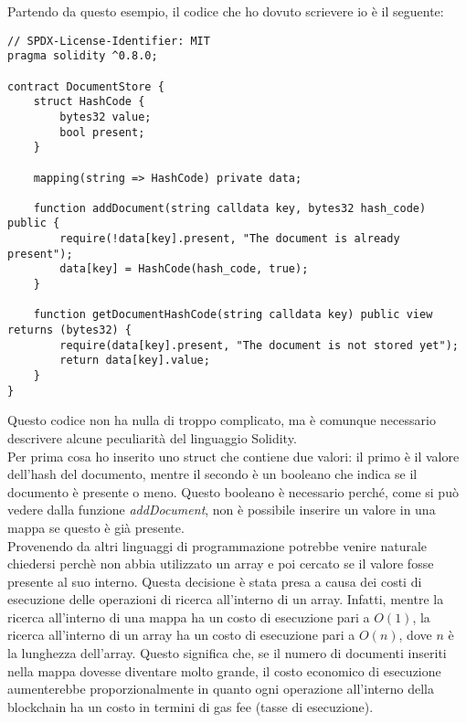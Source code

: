 Partendo da questo esempio, il codice che ho dovuto scrievere io è il seguente:
\begin{lstlisting}[language=Solidity]
// SPDX-License-Identifier: MIT
pragma solidity ^0.8.0;

contract DocumentStore {
    struct HashCode {
        bytes32 value;
        bool present;
    }

    mapping(string => HashCode) private data;

    function addDocument(string calldata key, bytes32 hash_code) public {
        require(!data[key].present, "The document is already present");
        data[key] = HashCode(hash_code, true);
    }

    function getDocumentHashCode(string calldata key) public view returns (bytes32) {
        require(data[key].present, "The document is not stored yet");
        return data[key].value;
    }
}
\end{lstlisting}

Questo codice non ha nulla di troppo complicato, ma è comunque necessario
descrivere alcune peculiarità del linguaggio Solidity.\\
Per prima cosa ho inserito uno struct che contiene due valori: il primo è il
valore dell'hash del documento, mentre il secondo è un booleano che indica se
il documento è presente o meno. Questo booleano è necessario perché, come si
può vedere dalla funzione \textit{addDocument}, non è possibile inserire un
valore in una mappa se questo è già presente. \\
Provenendo da altri linguaggi di programmazione potrebbe venire naturale
chiedersi perchè non abbia utilizzato un array e poi cercato se il valore fosse
presente al suo interno. Questa decisione è stata presa a causa dei costi di
esecuzione delle operazioni di ricerca all'interno di un array. Infatti, mentre
la ricerca all'interno di una mappa ha un costo di esecuzione pari a $O(1)$, la
ricerca all'interno di un array ha un costo di esecuzione pari a $O(n)$, dove
$n$ è la lunghezza dell'array. Questo significa che, se il numero di documenti
inseriti nella mappa dovesse diventare molto grande, il costo economico di 
esecuzione aumenterebbe proporzionalmente in quanto ogni operazione all'interno
della blockchain ha un costo in termini di gas fee (tasse di esecuzione).

